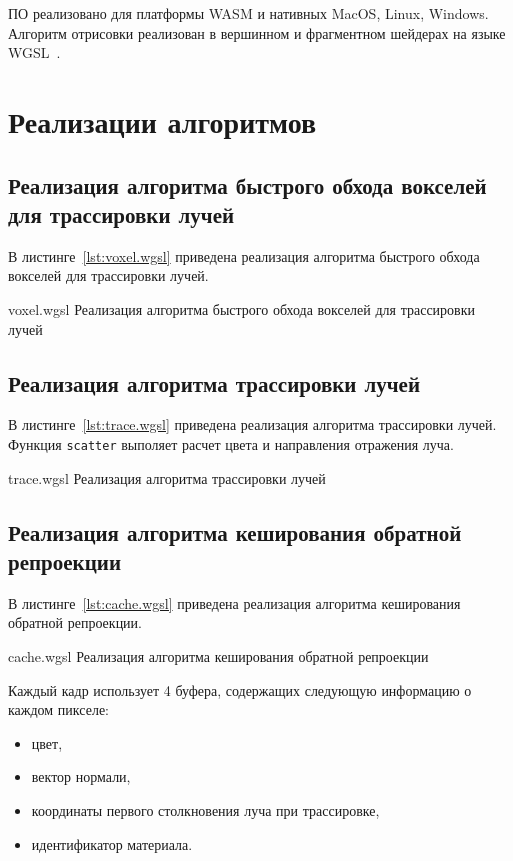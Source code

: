 ПО реализовано для платформы WASM и нативных MacOS, Linux, Windows. 
Алгоритм отрисовки реализован в вершинном и фрагментном шейдерах на языке WGSL~\cite{WebGPUSL}.

\section{Реализации алгоритмов}

\subsection{Реализация алгоритма быстрого обхода вокселей для трассировки лучей}

В листинге~\ref{lst:voxel.wgsl} приведена реализация алгоритма быстрого 
обхода вокселей для трассировки лучей.

\pagebreak

    {voxel.wgsl}
    {Реализация алгоритма быстрого обхода вокселей для трассировки лучей}

\subsection{Реализация алгоритма трассировки лучей}

В листинге~\ref{lst:trace.wgsl} приведена реализация алгоритма трассировки лучей.
Функция \verb|scatter| выполяет расчет цвета и направления отражения луча.

    {trace.wgsl}
    {Реализация алгоритма трассировки лучей}

\subsection{Реализация алгоритма кеширования обратной репроекции}

В листинге~\ref{lst:cache.wgsl} приведена реализация алгоритма кеширования обратной репроекции.

    {cache.wgsl}
    {Реализация алгоритма кеширования обратной репроекции}

Каждый кадр использует 4 буфера, содержащих следующую информацию о каждом пикселе:
\begin{itemize}
    \item цвет,
    \item вектор нормали,
    \item координаты первого столкновения луча при трассировке,
    \item идентификатор материала.
\end{itemize}

